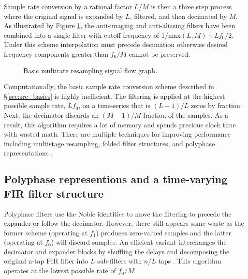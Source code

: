 \documentclass[11pt,preprint]{aastex}
\newcommand{\z}{\mathpzc{z}}
\begin{document}
Sample rate conversion by a rational factor $L/M$ is then a three step process where the original signal is 
expanded by $L$, filtered, and then decimated by $M$.  As illustrated by Figure \ref{fig:resample_basic}, 
the anti-imaging and 
anti-aliasing filters have been combined into a single filter with cutoff frequency of 
$1/\mathrm{max}(L,M) \times Lf_0/2$.  Under this scheme interpolation must precede decimation otherwise desired 
frequency components greater than $f_0/M$ cannot be preserved.

\begin{figure}[H!]
\centering
\label{fig:resample_basic}
\caption{Basic multirate resampling signal flow graph.}
\end{figure}

\iffalse %



\fi %

Computationally, the basic sample rate conversion scheme described in \S\ref{sec:src_basics} is highly 
inefficient.  The filtering is applied at the highest possible sample rate, $Lf_0$, on
a time-series that is $(L-1)/L$ zeros by fraction. Next, the decimator discards an $(M-1)/M$ fraction of the 
samples.  As a result, this algorithm requires a lot of memory and spends precious clock 
time with wasted math.  There are multiple techniques for improving performance including 
multistage resampling, folded filter structures, and polyphase representations \citep{oppenheim10,lyons11,
vaidyanathan93}.

\subsection{Polyphase representions and a time-varying FIR filter structure}
Polyphase filters use the Noble identities to move the filtering to precede the expander
or follow the decimator.  However, there still appears some waste as the former scheme (operating at $f_1$) 
produces zero-valued samples and the latter (operating at $f_0$) will discard samples.  An efficient variant
interchanges the decimator and expander blocks by shuffling the delays and decomposing the original n-tap FIR 
filter into $L$ sub-filters with $n/L$ taps \citep{crochiere81}.  This algorithm operates at the lowest 
possible rate of $f_0/M$.
\end{document}
